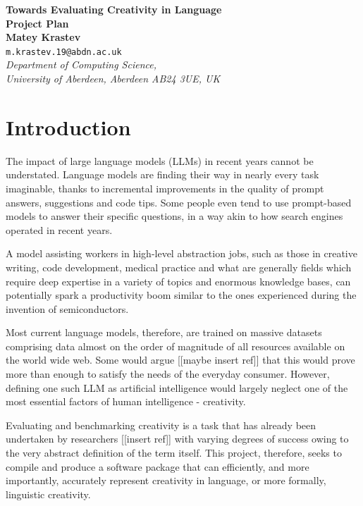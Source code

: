 \documentclass[a4paper,12pt]{article}
\begin{document}
\begin{center}
{\Large\bf{Towards Evaluating Creativity in Language}} \\
      \vspace{5.0mm}
{\Large\bf{Project Plan}} \\
      \vspace{8mm}
      {\large\bf{Matey Krastev}}  \\
      \vspace{5.0mm}
       {\tt m.krastev.19@abdn.ac.uk} \\
      \vspace{5.0mm}
      {\em Department of Computing Science,\\
       University of Aberdeen, Aberdeen AB24 3UE, UK} 
\end{center}


\section*{Introduction}
The impact of large language models (LLMs) in recent years cannot be understated. 
Language models are finding their way in nearly every task imaginable, thanks to incremental improvements in the quality of prompt answers, suggestions and code tips. Some people even tend to use prompt-based models to answer their specific questions, in a way akin to how search engines operated in recent years. 

A model assisting workers in high-level abstraction jobs, such as those in creative writing, code development, medical practice and what are generally fields which require deep expertise in a variety of topics and enormous knowledge bases, can potentially spark a productivity boom similar to the ones experienced during the invention of semiconductors.

Most current language models, therefore, are trained on massive datasets comprising data almost on the order of magnitude of all resources available on the world wide web. Some would argue [[maybe insert ref]] that this would prove more than enough to satisfy the needs of the everyday consumer. However, defining one such LLM as artificial intelligence would largely neglect one of the most essential factors of human intelligence - creativity. 

Evaluating and benchmarking creativity is a task that has already been undertaken by researchers [[insert ref]] with varying degrees of success owing to the very abstract definition of the term itself. This project, therefore, seeks to compile and produce a software package that can efficiently, and more importantly, accurately represent creativity in language, or more formally, linguistic creativity. 
\end{document}
